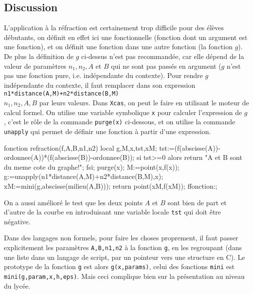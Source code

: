 \documentclass[12pt,a4paper]{book}
\begin{document}
\begin{giacjshere}
\subsection{Discussion}
L'application \`a la r\'efraction
est certainement trop difficile pour des \'el\`eves d\'ebutants, on 
d\'efinit en effet ici une fonctionnelle (fonction dont un argument
est une fonction), et on d\'efinit une fonction dans une 
autre fonction (la fonction $g$). De plus la d\'efinition
de $g$ ci-dessus n'est pas recommand\'ee, car elle
d\'epend de la valeur de param\`etres $n_1,n_2, A$ et $B$ qui
ne sont pas pass\'es en argument
($g$ n'est pas une fonction
pure, i.e. ind\'ependante du contexte).
Pour rendre $g$ ind\'ependante du contexte, il faut remplacer 
dans son expression
\verb|n1*distance(A,M)+n2*distance(B,M)|\\ 
$n_1,n_2,A,B$ par leurs valeurs. Dans {\tt Xcas}, on peut le faire 
en utilisant le moteur de calcul formel. On utilise une variable
symbolique \verb|x| pour calculer l'expression de $g$,
c'est le r\^ole de la commande \verb|purge(x)| ci-dessous, 
et on utilise la commande \verb|unapply| qui permet de d\'efinir
une fonction \`a partir d'une expression.
\begin{giacprog}
fonction refraction(f,A,B,n1,n2)
  local g,M,x,tst,xM;
  tst:=(f(abscisse(A))-ordonnee(A))*(f(abscisse(B))-ordonnee(B));
  si tst>=0 alors return "A et B sont du meme cote du graphe!"; fsi;
  purge(x);
  M:=point(x,f(x));
  g:=unapply(n1*distance(A,M)+n2*distance(B,M),x);
  xM:=mini(g,abscisse(milieu(A,B)));
  return point(xM,f(xM));
ffonction:;
\end{giacprog}
On a aussi am\'elior\'e le test que les deux points $A$ et 
$B$ sont bien de part
et d'autre de la courbe
en introduisant une variable locale \verb|tst|
qui doit \^etre n\'egative.

Dans des langages non formels, pour faire les choses proprement, il
faut passer explicitement les param\`etres \verb|A,B,n1,n2| \`a la
fonction \verb|g|, en les regroupant (dans une liste dans un langage
de script, par un pointeur vers une structure en C).
Le prototype de la fonction \verb|g| est alors \verb|g(x,params)|,
celui des fonctions \verb|mini| est \verb|mini(g,param,x,h,eps)|. Mais
ceci complique bien sur la pr\'esentation au niveau du lyc\'ee.


\end{giacjshere}
\end{document}
